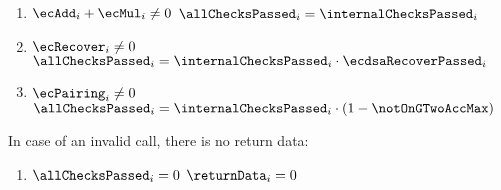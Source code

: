 \begin{enumerate}
    \item \If $\ecAdd_i + \ecMul_i \neq 0$ \Then $\allChecksPassed_i = \internalChecksPassed_i$
    \item \If $\ecRecover_i \neq 0$ \Then $\allChecksPassed_i = \internalChecksPassed_i \cdot \ecdsaRecoverPassed_i$
    \item \If $\ecPairing_i \neq 0$ \Then $\allChecksPassed_i = \internalChecksPassed_i \cdot (1 - \notOnGTwoAccMax)$
\end{enumerate}

In case of an invalid call, there is no return data:

\begin{enumerate}[resume]
    \item \If $\allChecksPassed_i = 0$ \Then $\returnData_i = 0$
\end{enumerate}